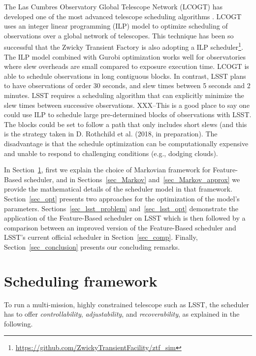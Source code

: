 \documentclass[12pt]{aastex62}
\theoremstyle{definition}
\begin{document}
The Las Cumbres Observatory Global Telescope Network (LCOGT) has developed one of the most advanced telescope scheduling algorithms \citep{Boroson14, Saunders14}. LCOGT uses an integer linear programming (ILP) model to optimize scheduling of observations over a global network of telescopes\citep{Lampoudi15}. This technique has been so successful that the Zwicky Transient Factory \citep{Bellm14}is also adopting a ILP scheduler\footnote{\url{https://github.com/ZwickyTransientFacility/ztf_sim}}. The ILP model combined with Gurobi optimization works well for observatories where slew overheads are small compared to exposure execution time. LCOGT is able to schedule observations in long contiguous blocks. In contrast, LSST plans to have observations of order 30 seconds, and slew times between 5 seconds and 2 minutes. LSST requires a scheduling algorithm that can explicitly minimize the slew times between successive observations. XXX--This is a good place to say one could use ILP to schedule large pre-determined blocks of observations with LSST. The blocks could be set to follow a path that only includes short slews (and this is the strategy taken in D. Rothchild et al. (2018, in preparation). The disadvantage is that the schedule optimization can be computationally expensive and unable to respond to challenging conditions (e.g., dodging clouds). 

In Section~\ref{sec_SM}, first we explain the choice of Markovian framework for Feature-Based scheduler, and in Sections~\ref{sec_Markov} and~\ref{sec_Markov_approx} we provide the mathematical details of the scheduler model in that framework. Section~\ref{sec_opt} presents two approaches for the optimization of the model's parameters. Sections~\ref{sec_lsst_problem} and~\ref{sec_lsst_opt} demonstrate the application of the Feature-Based scheduler on LSST which is then followed by a comparison between an improved version of the Feature-Based scheduler and LSST's current official scheduler in Section~\ref{sec_comp}. Finally, Section~\ref{sec_conclusion} presents our concluding remarks.



\section{Scheduling framework}\label{sec_SM}

To run a multi-mission, highly constrained telescope such as LSST, the scheduler has to offer \textit{controllability}, \textit{adjustability}, and \textit{recoverability}, as explained in the following.
\end{document}

